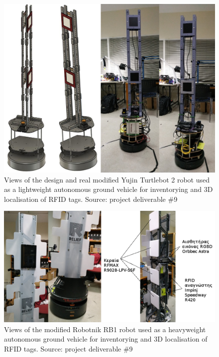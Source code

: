 \begin{minipage}[t][\textheight]{\textwidth}
\begin{figure}[H]\centering
  \includegraphics[scale=0.4]{images/relief/tb/tb_1x4.png}
  \caption{\small Views of the design and real modified Yujin Turtlebot 2 robot
           used as a lightweight autonomous ground vehicle for inventorying and
           3D localisation of RFID tags. Source: project deliverable \#9}
  \label{fig:relief_tb_1x4}
\end{figure}

\vfill

\begin{figure}[H]\centering
  \includegraphics[scale=0.4]{images/relief/rb1/rb1_1x4.png}
  \caption{\small Views of the modified Robotnik RB1 robot used as a heavyweight
           autonomous ground vehicle for inventorying and 3D localisation of
           RFID tags. Source: project deliverable \#9}
  \label{fig:relief_rb1_1x4}
\end{figure}
\end{minipage}

